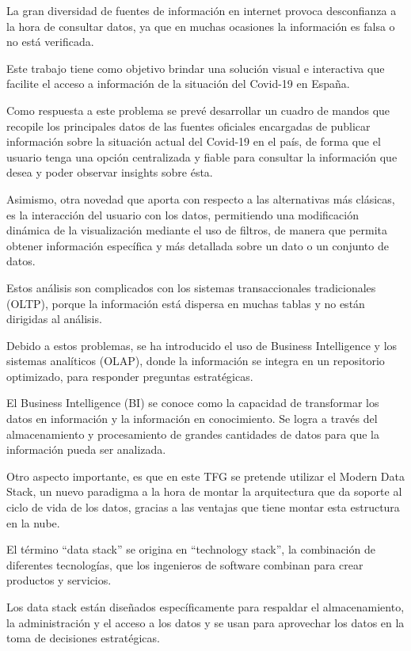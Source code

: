 La gran diversidad de fuentes de información en internet provoca desconfianza a la hora de consultar datos, ya que en muchas ocasiones la información es falsa o no está verificada.

Este trabajo tiene como objetivo brindar una solución visual e interactiva que facilite el acceso a información de la situación del Covid-19 en España.

Como respuesta a este problema se prevé desarrollar un cuadro de mandos que recopile los principales datos de las fuentes oficiales encargadas de publicar información sobre la situación actual del Covid-19 en el país, de forma que el usuario tenga una opción centralizada y fiable para consultar la información que desea y poder observar insights sobre ésta. 

Asimismo, otra novedad que aporta con respecto a las alternativas más clásicas, es la interacción del usuario con los datos, permitiendo una modificación dinámica de la visualización mediante el uso de filtros, de manera que permita obtener información específica y más detallada sobre un dato o un conjunto de datos.

Estos análisis son complicados con los sistemas transaccionales tradicionales (OLTP), porque la información está dispersa en muchas tablas y no están dirigidas al análisis. 

Debido a estos problemas, se ha introducido el uso de Business Intelligence y los sistemas analíticos (OLAP), donde la información se integra en un repositorio optimizado, para responder preguntas estratégicas. 

El Business Intelligence (BI) se conoce como la capacidad de transformar los datos en información y la información en conocimiento. Se logra a través del almacenamiento y procesamiento de grandes cantidades de datos para que la información pueda ser analizada.

Otro aspecto importante, es que en este TFG se pretende utilizar el Modern Data Stack, un nuevo paradigma a la hora de montar la arquitectura que da soporte al ciclo de vida de los datos, gracias a las ventajas que tiene montar esta estructura en la nube.

El término “data stack” se origina en “technology stack”, la combinación de diferentes tecnologías, que los ingenieros de software combinan para crear productos y servicios. 

Los data stack están diseñados específicamente para respaldar el almacenamiento, la administración y el acceso a los datos y se usan para aprovechar los datos en la toma de decisiones estratégicas. 

